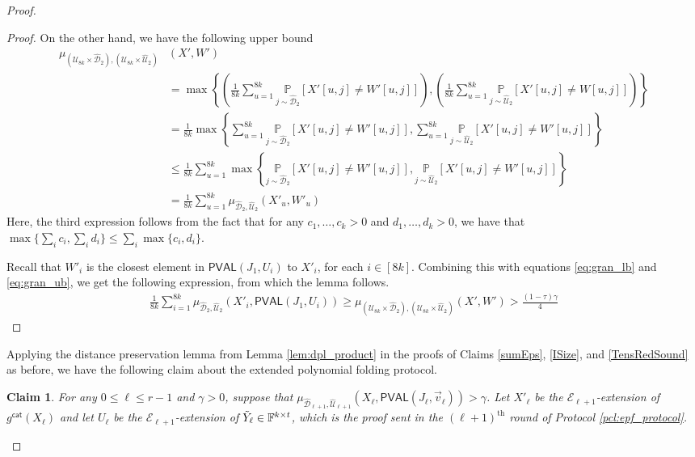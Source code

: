 \documentclass[10pt,a4paper]{article}
\newtheorem{claim}[theorem]{Claim}
\newcommand{\PVAL}{\mathsf{PVAL}}
\newcommand{\F}{\mathbb{F}}
\newcommand{\sU}{\mathcal{U}}
\newcommand{\sD}{\mathcal{D}}
\begin{document}
\begin{proof}
\begin{proof}
    On the other hand, we have the following upper bound
    \begin{equation}
    \label{eq:gran_ub}
        \begin{split}
            \mu_{(\sU_{8k} \times \widehat{\sD}_{2}), (\sU_{8k} \times \widehat{\sU}_{2})} &(X', W') 
            \\
            &= \max \left\{ \left( \frac{1}{8k} \sum_{u=1}^{8k} \underset{j \sim \widehat{\sD}_{2}}{\mathbb{P}} \left[ X'[u,j] \neq W'[u,j] \right] \right), \left( \frac{1}{8k} \sum_{u=1}^{8k} \underset{j \sim \widehat{\sU}_{2}}{\mathbb{P}} \left[ X'[u,j] \neq W[u,j] \right] \right) \right\}\\
            &= \frac{1}{8k}\max \left\{  \sum_{u=1}^{8k} \underset{j \sim \widehat{\sD}_{2}}{\mathbb{P}} \left[ X'[u,j] \neq W'[u,j] \right], \sum_{u=1}^{8k} \underset{j \sim \widehat{\sU}_{2}}{\mathbb{P}} \left[ X'[u,j] \neq W'[u,j] \right] \right\} \\
            &\leq \frac{1}{8k} \sum_{u=1}^{8k} \max \left\{ \underset{j \sim \widehat{\sD}_{2}}{\mathbb{P}} \left[ X'[u,j] \neq W'[u,j] \right],\underset{j \sim \widehat{\sU}_{2}}{\mathbb{P}} \left[ X'[u,j] \neq W'[u,j] \right] \right\} \\
            &= \frac{1}{8k} \sum_{u=1}^{8k} \mu_{\widehat{\sD}_2, \widehat{\sU}_2} (X'_u, W'_u)
        \end{split}
    \end{equation}
    Here, the third expression follows from the fact that for any $c_1, \dots, c_k > 0$ and $d_1, \dots, d_k > 0$, we have that $\max \{\sum_i c_i, \sum_i d_i\} \leq \sum_i \max \{c_i,d_i\}$.
    
    Recall that $W'_i$ is the closest element in $\PVAL(J_{1}, U_{i})$ to $X'_i$, for each $i \in [8k]$. Combining this with equations \ref{eq:gran_lb} and \ref{eq:gran_ub}, we get the following expression, from which the lemma follows.
    \begin{equation*}
    \begin{split}
        \frac{1}{8k} \sum_{i=1}^{8k} \mu_{\widehat{\sD}_2, \widehat{\sU}_2} (X'_i, \PVAL(J_{1}, U_{i})) \geq \mu_{(\sU_{8k} \times \widehat{\sD}_{2}), (\sU_{8k} \times \widehat{\sU}_{2})} (X', W') > \frac{(1-\tau)\gamma}{4}
    \end{split}
    \end{equation*}
\end{proof}

Applying the distance preservation lemma from Lemma \ref{lem:dpl_product} in the proofs of Claims \ref{sumEps}, \ref{ISize}, and \ref{TensRedSound} as before, we have the following claim about the extended polynomial folding protocol.
\begin{claim}
\label{clm:good_folding_extended}
For any $0 \leq \ell \leq r-1$ and $\gamma > 0$, suppose that $\mu_{\widehat{\sD}_{\ell+1},\widehat{\sU}_{\ell+1}}(X_\ell,\PVAL(J_\ell,\vec{v}_\ell))>\gamma$. Let $X'_\ell$ be the $\mathcal{E}_{\ell+1}$-extension of $g^{\mathsf{cat}}(X_\ell)$ and let $U_\ell$ be the $\mathcal{E}_{\ell+1}$-extension of $\Tilde{Y}_\ell \in \F^{k \times t}$, which is the proof sent in the $(\ell+1)^{\text{th}}$ round of Protocol \ref{pcl:epf_protocol}. 


\end{claim}
\end{proof}
\end{document}
